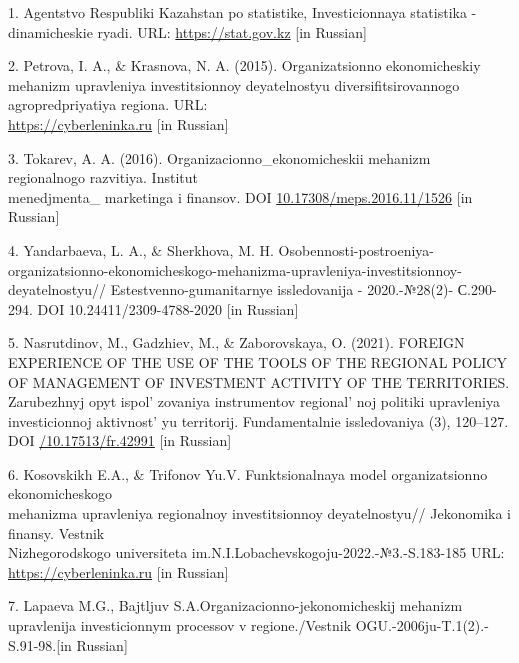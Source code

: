 \begin{references}
1. Agentstvo Respubliki Kazahstan po statistike, Investicionnaya
statistika - dinamicheskie ryadi. URL:
\href{https://stat.gov.kz/ru/industries/business-statistics/stat-invest/dynamic-tables/}{https://stat.gov.kz}
{[}in Russian{]}

2. Petrova, I. A., \& Krasnova, N. A. (2015). Organizatsionno
ekonomicheskiy mehanizm upravleniya investitsionnoy deyatelnostyu
diversifitsirovannogo agropredpriyatiya regiona. URL:\\
\href{https://cyberleninka.ru/article/n/organizatsionno-ekonomicheskiy-mehanizm-upravleniya-investitsionnoy-deyatelnostyu-diversifitsirovannogo-agropredpriyatiya-regiona}{https://cyberleninka.ru}
{[}in Russian{]}

3. Tokarev, A. A. (2016). Organizacionno\_ekonomicheskii mehanizm
regionalnogo razvitiya. Institut \\menedjmenta\_ marketinga i finansov.
DOI \href{https://doi.org/10.17308/meps.2016.11/1526}{10.17308/meps.2016.11/1526}
{[}in Russian{]}

4. Yandarbaeva, L. A., \& Sherkhova, M. H.
Osobennosti-postroeniya-organizatsionno-ekonomicheskogo-mehanizma-upravleniya-investitsionnoy-deyatelnostyu//
Estestvenno-gumanitarnye issledovanija - 2020.-№28(2)- С.290-294. DOI
10.24411/2309-4788-2020 {[}in Russian{]}

5. Nasrutdinov, M., Gadzhiev, M., \& Zaborovskaya, O. (2021). FOREIGN
EXPERIENCE OF THE USE OF THE TOOLS OF THE REGIONAL POLICY OF
MANAGEMENT OF INVESTMENT ACTIVITY OF THE TERRITORIES. Zarubezhnyj opyt
ispol' zovaniya instrumentov
regional' noj politiki upravleniya investicionnoj
aktivnost' yu territorij. Fundamentalnie issledovaniya
(3), 120--127. DOI
\href{https://doi.org/10.17513/fr.42991}{/10.17513/fr.42991} {[}in
Russian{]}

6. Kosovskikh E.A., \& Trifonov Yu.V. Funktsionalnaya model
organizatsionno ekonomicheskogo \\mehanizma upravleniya regionalnoy
investitsionnoy deyatelnostyu// Jekonomika i finansy. Vestnik\\
Nizhegorodskogo universiteta
im.N.I.Lobachevskogoju-2022.-№3.-S.183-185 URL:\\
\href{https://cyberleninka.ru/article/n/funktsionalnaya-model-organizatsionno-ekonomicheskogo-mehanizma-upravleniya-regionalnoy-investitsionnoy-deyatelnostyu}{https://cyberleninka.ru}
{[}in Russian{]}

7. Lapaeva M.G., Bajtljuv S.A.Organizacionno-jekonomicheskij mehanizm
upravlenija investicionnym processov v regione./Vestnik
OGU.-2006ju-T.1(2).-S.91-98.{[}in Russian{]}


\end{references}
